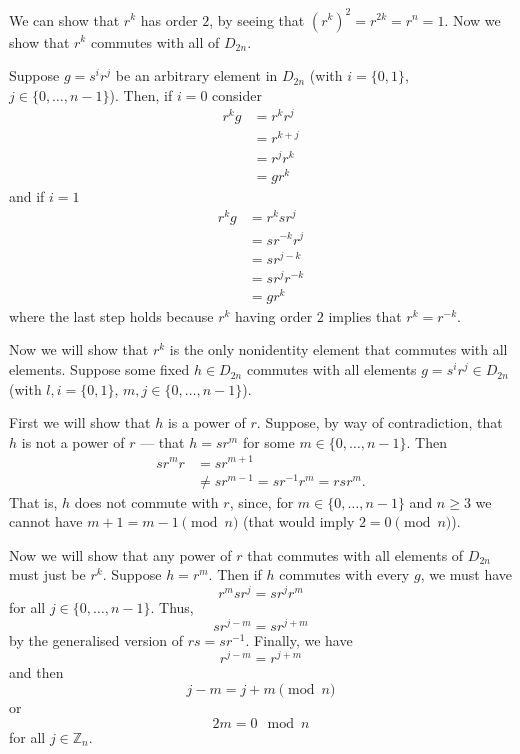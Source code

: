\documentclass[12 pt, letterpaper]{hmcpset}
\begin{document}
\begin{solution}
	We can show that $r^k$ has order $2$, by seeing that $(r^k)^2 = r^{2k} = r^n = 1$. Now we show that $r^k$ commutes with all of $D_{2n}$.

	Suppose $g = s^i r^j$ be an arbitrary element in $D_{2n}$ (with $i = \{ 0, 1 \}$, $j \in \{ 0, \ldots, n - 1 \}$). Then, if $i = 0$ consider
	\[
		\begin{split}
			r^k g & = r^k r^j \\
			      & = r^{k + j} \\
			      & = r^j r^k \\
			      & = g r^k
		\end{split}
	\]
	and if $i = 1$
	\[
		\begin{split}
			r^k g & = r^k s r^j \\
			      & = s r^{-k} r^j \\
			      & = s r^{j - k} \\
			      & = s r^j r^{-k} \\
			      & = g r^k
		\end{split}
	\]
	where the last step holds because $r^k$ having order $2$ implies that $r^k = r^{-k}$. 

	Now we will show that $r^k$ is the only nonidentity element that commutes with all elements. Suppose some fixed $h \in D_{2n}$ commutes with all elements $g = s^i r^j \in D_{2n}$ (with $l, i = \{ 0, 1 \}$, $m, j \in \{ 0, \ldots, n - 1 \}$). 

	First we will show that $h$ is a power of $r$. Suppose, by way of contradiction, that $h$ is not a power of $r$ --- that $h = s r^m$ for some $m \in \{ 0, \ldots, n - 1 \}$. Then
	\[
		\begin{split}
			s r^m r & = s r^{m + 1} \\
				& \neq s r^{m - 1} = s r^{-1} r^m = r s r^m.
		\end{split}
	\]
	That is, $h$ does not commute with $r$, since, for $m \in \{ 0, \ldots, n - 1 \}$ and $n \ge 3$ we cannot have $m + 1 = m - 1 \pmod n$ (that would imply $2 = 0 \pmod n$). 

	Now we will show that any power of $r$ that commutes with all elements of $D_{2n}$ must just be $r^k$. Suppose $h = r^m$. Then if $h$ commutes with every $g$, we must have
	\[
		r^m s r^j = s r^j r^m
	\]
	for all $j \in \{ 0, \ldots, n - 1 \}$. Thus,
	\[
		s r^{j - m} = s r^{j + m}
	\]
	by the generalised version of $r s = s r^{-1}$. Finally, we have
	\[
		r^{j - m} = r^{j + m}
	\]
	and then
	\[
		j - m = j + m \pmod n
	\]
	or
	\[
		2m = 0 \mod n
	\]
	for all $j \in \mathbb Z_n$. 


\end{solution}
\end{document}
